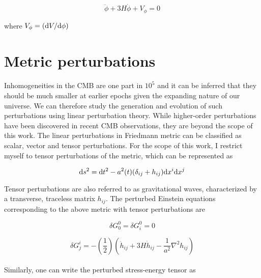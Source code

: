 \documentclass[12pt,a4paper,oneside]{book}
\begin{document}
\begin{equation}
\ddot{\phi} + 3H\dot{\phi} + V_{\phi} = 0
\end{equation}

\noindent where $V_{\phi} = \left({\rm d}V/{\rm d}\phi\right)$

\section{Metric perturbations}

\paragraph*{} Inhomogeneities in the CMB are one part in $10^5$ and it can be inferred that they should be much smaller at earlier 
epochs given the expanding nature of our universe. We can therefore study the generation and evolution of such perturbations using 
linear perturbation theory. While higher-order perturbations have been discovered in recent CMB observations, they are beyond the 
scope of this work. The linear perturbations in Friedmann metric can be classified as scalar, vector and tensor perturbations. 
For the scope of this work, I restrict myself to tensor perturbations of the metric, which can be represented as

\begin{equation}
{\rm d}s^2 = {\rm d}t^2 - a^2(t)(\delta_{ij} + h_{ij}){\rm d}x^i{\rm d}x^j
\end{equation}

\noindent Tensor perturbations are also referred to as gravitational waves, characterized by a transverse, traceless matrix $h_{ij}$. 
The perturbed Einstein equations corresponding to the above metric with tensor perturbations are

\begin{equation}
\delta G^0_0 = \delta G^0_i = 0
\end{equation}

\begin{equation}
\delta G^i_j = -\left(\frac{1}{2}\right)\left(\ddot{h}_{ij} + 3H\dot{h}_{ij} - \frac{1}{a^2}\nabla ^2h_{ij}\right)
\end{equation}

\paragraph*{} Similarly, one can write the perturbed stress-energy tensor as
\end{document}
